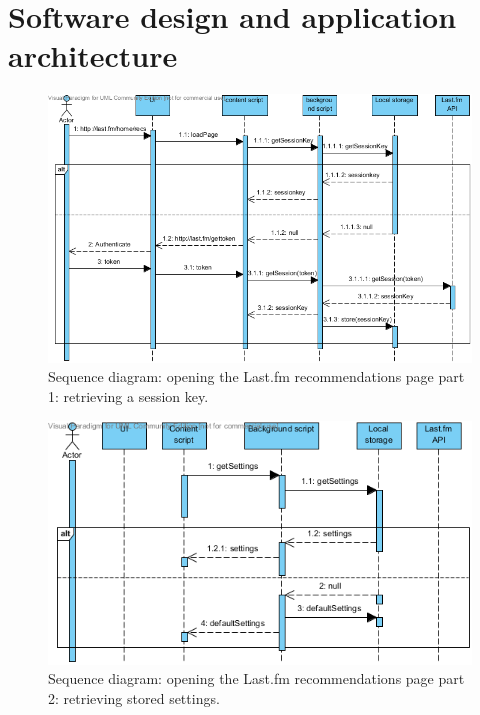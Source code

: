 \section{Software design and application architecture}\label{chapter:implementation:section:design}



\begin{figure}%
	\begin{center}
		\includegraphics[width=\columnwidth]{img/seq_part1}%
	\end{center}
	\caption{Sequence diagram: opening the Last.fm recommendations page part 1: retrieving a session key.}%
	\label{fig:sequence:part1}%
\end{figure}

\begin{figure}%
	\begin{center}
		\includegraphics[width=\columnwidth]{img/seq_part2}%
	\end{center}
	\caption{Sequence diagram: opening the Last.fm recommendations page part 2: retrieving stored settings.}%
	\label{fig:sequence:part2}%
\end{figure}

